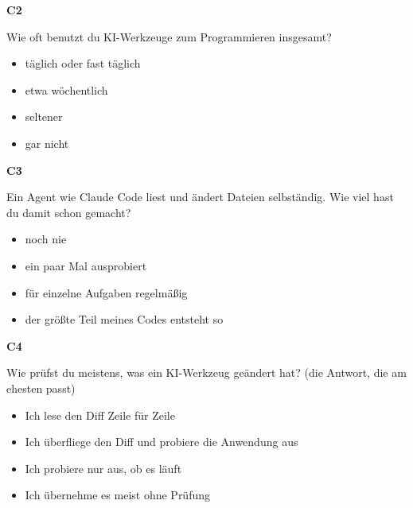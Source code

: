 \medskip

\noindent\begin{minipage}{\linewidth}
\textbf{C2}\par
Wie oft benutzt du KI-Werkzeuge zum Programmieren insgesamt?

\begin{itemize}[nosep,leftmargin=2.4em]
\item[\kreuz] täglich oder fast täglich
\item[\kreuz] etwa wöchentlich
\item[\kreuz] seltener
\item[\kreuz] gar nicht
\end{itemize}
\end{minipage}

\medskip

\noindent\begin{minipage}{\linewidth}
\textbf{C3}\par
Ein Agent wie Claude Code liest und ändert Dateien selbständig. Wie viel hast du damit schon gemacht?

\begin{itemize}[nosep,leftmargin=2.4em]
\item[\kreuz] noch nie
\item[\kreuz] ein paar Mal ausprobiert
\item[\kreuz] für einzelne Aufgaben regelmäßig
\item[\kreuz] der größte Teil meines Codes entsteht so
\end{itemize}
\end{minipage}

\medskip

\noindent\begin{minipage}{\linewidth}
\textbf{C4}\par
Wie prüfst du meistens, was ein KI-Werkzeug geändert hat? (die Antwort, die am ehesten passt)

\begin{itemize}[nosep,leftmargin=2.4em]
\item[\kreuz] Ich lese den Diff Zeile für Zeile
\item[\kreuz] Ich überfliege den Diff und probiere die Anwendung aus
\item[\kreuz] Ich probiere nur aus, ob es läuft
\item[\kreuz] Ich übernehme es meist ohne Prüfung
\end{itemize}
\end{minipage}

\medskip

